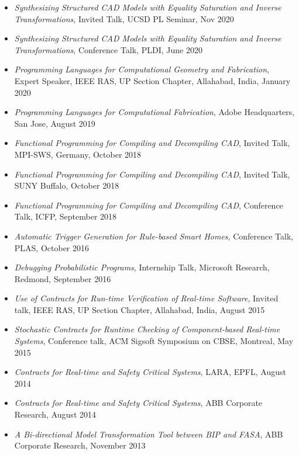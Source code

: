 \documentclass[margin, 10pt]{res} %
\begin{document}
\begin{resume}
\begin{itemize}[itemsep=.7pt]
 \item {\sl Synthesizing Structured CAD Models with Equality Saturation and Inverse Transformations}, Invited Talk, UCSD PL Seminar, Nov 2020
 \item {\sl Synthesizing Structured CAD Models with Equality Saturation and Inverse Transformations}, Conference Talk, PLDI, June 2020
 \item {\sl Programming Languages for Computational Geometry and Fabrication}, Expert Speaker, IEEE RAS, UP Section Chapter, Allahabad, India, January 2020
 \item {\sl Programming Languages for Computational Fabrication}, Adobe Headquarters, San Jose, August 2019
 \item {\sl Functional Programming for Compiling and Decompiling CAD}, Invited Talk, MPI-SWS, Germany, October 2018
 \item {\sl Functional Programming for Compiling and Decompiling CAD}, Invited Talk, SUNY Buffalo, October 2018
 \item {\sl Functional Programming for Compiling and Decompiling CAD}, Conference  Talk, ICFP, September 2018
 \item {\sl Automatic Trigger Generation for Rule-based Smart Homes}, Conference Talk, PLAS, October 2016
 \item {\sl Debugging Probabilistic Programs}, Internship Talk, Microsoft Research, Redmond, September 2016
 \item {\sl Use of Contracts for Run-time Verification of Real-time Software}, Invited talk, IEEE RAS, UP Section Chapter, Allahabad, India, August 2015
 \item {\sl Stochastic Contracts for Runtime Checking of Component-based Real-time Systems}, Conference talk, ACM Sigsoft Symposium on CBSE, Montreal, May 2015
 \item {\sl Contracts for Real-time and Safety Critical Systems}, LARA, EPFL, August 2014
 \item {\sl Contracts for Real-time and Safety Critical Systems}, ABB Corporate Research, August 2014
 \item {\sl A Bi-directional Model Transformation Tool between BIP and FASA}, ABB Corporate Research, November 2013
 \end{itemize}


\end{resume}
\end{document}
